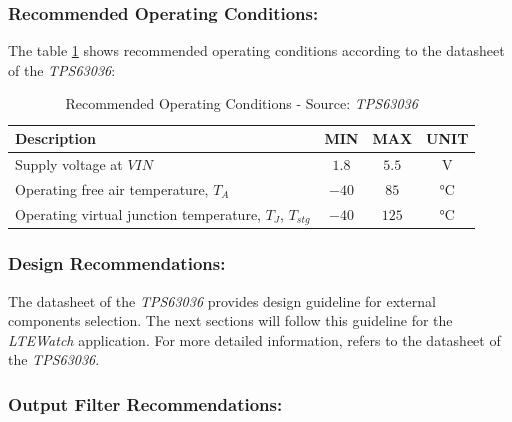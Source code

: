 \documentclass[report.tex]{subfiles}
\begin{document}
\subsubsection{Recommended Operating Conditions:}

The table \ref{tab:tps63036_recom_op} shows recommended operating conditions according to the datasheet of the \textit{TPS63036}\cite{TPS63036}:

\begin{table}[H]
\centering
\begin{tabularx}{\textwidth}{|X|c|c|c|}\hline
\textbf{Description} & \textbf{MIN} & \textbf{MAX} & \textbf{UNIT} \\\hline
Supply voltage at $VIN$ & $1.8$ & $5.5$ & $\si{\volt}$ \\\hline
Operating free air temperature, $T_A$ & $-40$ & $85$ & $\si{\celsius}$ \\\hline 
Operating virtual junction temperature, $T_J$, $T_{stg}$ & $-40$ & $125$ & $\si{\celsius}$ \\\hline 
 
\end{tabularx}
\caption{Recommended Operating Conditions - Source: \textit{TPS63036}\cite{TPS63036}}
\label{tab:tps63036_recom_op}
\end{table}

\subsubsection{Design Recommendations:} \label{sec:bck_bst_sel}
The datasheet of the \textit{TPS63036}\cite{TPS63036} provides design guideline for external components selection. The next sections will follow this guideline for the \textit{LTEWatch} application. For more detailed information, refers to the datasheet of the \textit{TPS63036}\cite{TPS63036}. 

\subsubsection{Output Filter Recommendations:}
\end{document}
